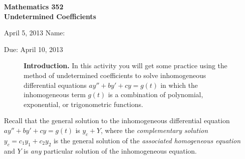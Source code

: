 \documentclass[11pt]{exam}
\begin{document}
\noindent
\textbf{{\large Mathematics 352 \\ Undetermined Coefficients}}

\noindent
April 5, 2013 \hfill Name: \underline{\hspace{3in}} 

\noindent
Due: April 10, 2013

\noindent
\begin{figure}[h]
\centering
\begin{minipage}[b]{0.85\linewidth}
\textbf{Introduction.} In this activity you will get some practice using the method of undetermined coefficients to solve inhomogeneous differential equations $ay'' + by' + cy = g(t)$ in which the inhomogeneous term $g(t)$ is a combination of polynomial, exponential, or trigonometric functions.
\end{minipage}
\end{figure}

Recall that the general solution to the inhomogeneous differential equation $ay'' + by' + cy = g(t)$ is $y_c + Y$, where the \emph{complementary solution} $y_c = c_1 y_1 + c_2 y_2$ is the general solution of the \emph{associated homogeneous equation} and $Y$ is \emph{any} particular solution of the inhomogeneous equation.
\end{document}
